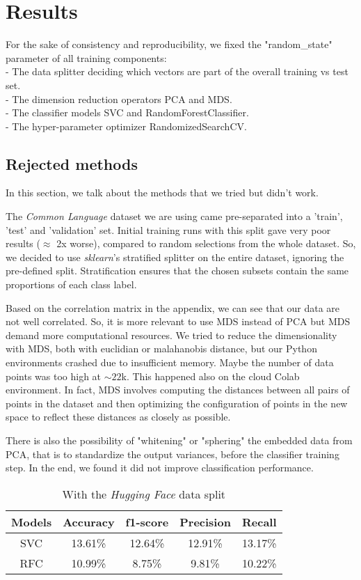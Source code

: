 \documentclass[twocolumn]{article}
\begin{document}
\newpage

\section{Results}
For the sake of consistency and reproducibility, we fixed the "random\_state" parameter of all training components: \\
- The data splitter deciding which vectors are part of the overall training vs test set. \\
- The dimension reduction operators PCA and MDS. \\
- The classifier models SVC and RandomForestClassifier. \\
- The hyper-parameter optimizer RandomizedSearchCV.

\subsection{Rejected methods}
In this section, we talk about the methods that we tried but didn't work.

The \textit{Common Language} dataset we are using came pre-separated into a 'train', 'test' and 'validation' set. Initial training runs with this split gave very poor results ($\approx$ 2x worse), compared to random selections from the whole dataset. So, we decided to use \textit{sklearn}'s stratified splitter on the entire dataset, ignoring the pre-defined split. Stratification ensures that the chosen subsets contain the same proportions of each class label.

Based on the correlation matrix in the appendix, we can see that our data are not well correlated. So, it is more relevant to use MDS instead of PCA but MDS demand more computational resources. We tried to reduce the dimensionality with MDS, both with euclidian or malahanobis distance, but our Python environments crashed due to insufficient memory. Maybe the number of data points was too high at $\sim22$k. This happened also on the cloud Colab environment. 
In fact, MDS involves computing the distances between all pairs of points in the dataset and then optimizing the configuration of points in the new space to reflect these distances as closely as possible.

There is also the possibility of "whitening" or "sphering" the embedded data from PCA, that is to standardize the output variances, before the classifier training step. In the end, we found it did not improve classification performance.

\begin{table}[h]
    \centering
    \begin{tabular}{|c|c|c|c|c|}
    \hline
      Models & Accuracy & f1-score & Precision & Recall\\  
      \hline
      SVC & 13.61\% & 12.64\% & 12.91\% & 13.17\%\\
        \hline
      RFC & 10.99\% & 8.75\% & 9.81\% & 10.22\% \\
    \hline
    \end{tabular}
    \label{tab:my_label}
    \caption{With the \textit{Hugging Face} data split}
\end{table}
\end{document}
